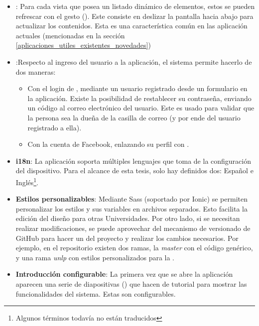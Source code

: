 \begin{itemize}
\item \textbf{}: Para cada vista que posea un listado dinámico de elementos, estos se pueden refrescar con el gesto  (). Este consiste en deslizar la pantalla hacia abajo para actualizar los contenidos. Esta es una característica común en las aplicación actuales (mencionadas en la sección \ref{aplicaciones_utiles_existentes_novedades})

\item \textbf{}:Respecto al ingreso del usuario a la aplicación, el sistema permite hacerlo de dos maneras:
\begin{itemize}
\item Con el login de \nombreApp, mediante un usuario registrado desde un formulario en la aplicación. Existe la posibilidad de restablecer su contraseña, enviando un código al correo electrónico del usuario. Este es usado para validar que la persona sea la dueña de la casilla de correo (y por ende del usuario registrado a ella).
\item Con la cuenta de Facebook, enlazando su perfil con \nombreApp.
\end{itemize}


\item \textbf{\gls{i18n}}: La aplicación soporta múltiples lenguajes que toma de la configuración del dispositivo. Para el alcance de esta tesis, solo hay definidos dos: Español e Inglés\footnote{Algunos términos todavía no están traducidos}. 

\item \textbf{Estilos personalizables}: Mediante Sass (soportado por Ionic) se permiten personalizar los estilos y sus variables en archivos separados. Esto facilita la edición del diseño para otras Universidades. Por otro lado, si se necesitan realizar modificaciones, se puede aprovechar del mecanismo de versionado de GitHub para hacer un  del proyecto y realizar los cambios necesarios. Por ejemplo, en el repositorio existen dos ramas, la \textit{master} con el código genérico, y una rama \textit{unlp} con estilos personalizados para la \unlp{}.

\item \textbf{Introducción configurable}: La primera vez que se abre la aplicación aparecen una serie de diapositivas () que hacen de tutorial para mostrar las funcionalidades del sistema. Estas son configurables.

\end{itemize}

